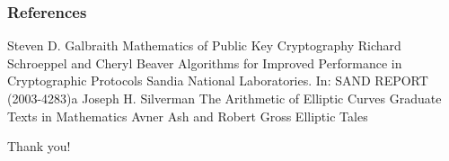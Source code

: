 \documentclass[xcolor=pdftex,dvipsnames,table]{beamer}
\theoremstyle{plain}
\theoremstyle{definition}
\begin{document}
\begin{frame}[allowframebreaks]
\frametitle{References}
\begin{thebibliography}{10}
		Steven D. Galbraith
		\newblock Mathematics of Public Key Cryptography
		Richard Schroeppel and Cheryl Beaver
		\newblock Algorithms for Improved Performance in Cryptographic Protocols
		\newblock Sandia National Laboratories. In: SAND REPORT (2003-4283)a
		Joseph H. Silverman
		\newblock The Arithmetic of Elliptic Curves
		\newblock Graduate Texts in Mathematics
		Avner {Ash} and Robert {Gross}
		\newblock Elliptic Tales
\end{thebibliography}
\end{frame}

\begin{frame}
\begin{Large}
\begin{center}
Thank you!
\end{center}
\end{Large}
\end{frame}
\end{document}
